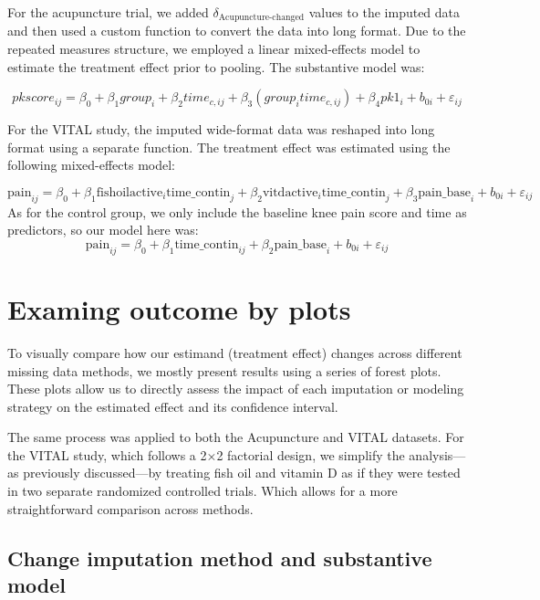 \documentclass{article}
\begin{document}
For the acupuncture trial, we added
\(\delta_\mathrm{Acupuncture\text{-}changed}\) values to the imputed
data and then used a custom function to convert the data into long
format. Due to the repeated measures structure, we employed a linear
mixed-effects model to estimate the treatment effect prior to pooling.
The substantive model was:

\[pkscore_{ij} = \beta_0 + \beta_1 group_i + \beta_2 time_{c,ij} + \beta_3 (group_i time_{c,ij}) + \beta_4 pk1_i + b_{0i} + \varepsilon_{ij}\]

For the VITAL study, the imputed wide-format data was reshaped into long
format using a separate function. The treatment effect was estimated
using the following mixed-effects model:

\[\text{pain}_{ij} = \beta_0 
+ \beta_1 \text{fishoilactive}_{i} \text{time\_contin}_{j}
+ \beta_2 \text{vitdactive}_{i} \text{time\_contin}_{j}
+ \beta_3 \text{pain\_base}_{i}
+ b_{0i} + \varepsilon_{ij}\] As for the control group, we only include
the baseline knee pain score and time as predictors, so our model here
was:
\[\text{pain}_{ij} = \beta_0 + \beta_1 \text{time\_contin}_{ij} + \beta_2 \text{pain\_base}_i + b_{0i} + \varepsilon_{ij}\]

\section{Examing outcome by plots}\label{examing-outcome-by-plots}

To visually compare how our estimand (treatment effect) changes across
different missing data methods, we mostly present results using a series
of forest plots. These plots allow us to directly assess the impact of
each imputation or modeling strategy on the estimated effect and its
confidence interval.

The same process was applied to both the Acupuncture and VITAL datasets.
For the VITAL study, which follows a 2×2 factorial design, we simplify
the analysis---as previously discussed---by treating fish oil and
vitamin D as if they were tested in two separate randomized controlled
trials. Which allows for a more straightforward comparison across
methods.

\subsection{Change imputation method and substantive
model}\label{change-imputation-method-and-substantive-model}
\end{document}
